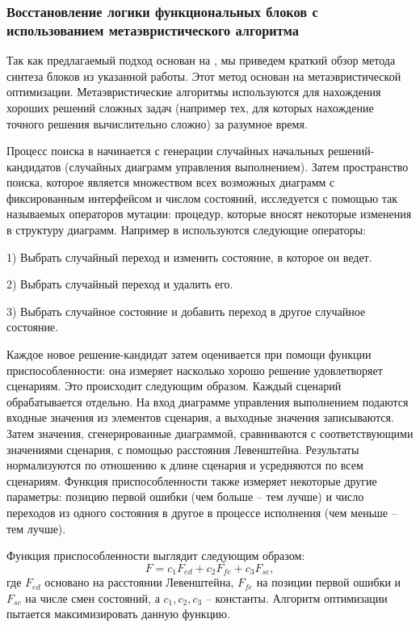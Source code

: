 \documentclass[14pt]{article}
\begin{document}
\subsubsection{Восстановление логики функциональных блоков с использованием
метаэвристического алгоритма}

Так как предлагаемый подход основан на \cite{rec}, мы приведем краткий обзор метода синтеза
блоков из указанной работы. Этот метод основан на метаэвристической
оптимизации. Метаэвристические алгоритмы используются для нахождения хороших
решений сложных задач (например тех, для которых нахождение точного решения
вычислительно сложно) за разумное время.

Процесс поиска в \cite{rec} начинается с генерации случайных начальных решений-кандидатов
(случайных диаграмм управления выполнением). Затем пространство поиска,
которое является множеством всех возможных диаграмм с фиксированным интерфейсом и числом состояний,
исследуется с помощью так называемых операторов мутации: процедур, которые
вносят некоторые изменения в структуру диаграмм. Например в \cite{rec} используются
следующие операторы:

1) Выбрать случайный переход и изменить состояние, в которое он ведет.

2) Выбрать случайный переход и удалить его.

3) Выбрать случайное состояние и добавить переход в другое случайное состояние.

Каждое новое решение-кандидат затем оценивается при помощи функции приспособленности:
она измеряет насколько хорошо решение удовлетворяет сценариям. Это происходит
следующим образом. Каждый сценарий обрабатывается отдельно. На вход
диаграмме управления выполнением подаются входные значения из элементов
сценария, а выходные значения записываются. Затем значения, сгенерированные
диаграммой, сравниваются с соответствующими значениями сценария, с помощью
расстояния Левенштейна. Результаты нормализуются по отношению к длине сценария
и усредняются по всем сценариям. Функция приспособленности также измеряет
некоторые другие параметры: позицию первой ошибки (чем больше -- тем лучше) и
число переходов из одного состояния в другое в процессе исполнения (чем меньше
-- тем лучше).

Функция приспособленности выглядит следующим образом:
$$
F = c_1 F_{ed} + c_2 F_{fe} + c_3 F_{sc},
$$
где $F_{ed}$ основано на расстоянии Левенштейна, $F_{fe}$ на позиции первой
ошибки и $F_{sc}$ на числе смен состояний, а $c_1, c_2, c_3$ -- константы.
Алгоритм оптимизации пытается максимизировать данную функцию.
\end{document}
